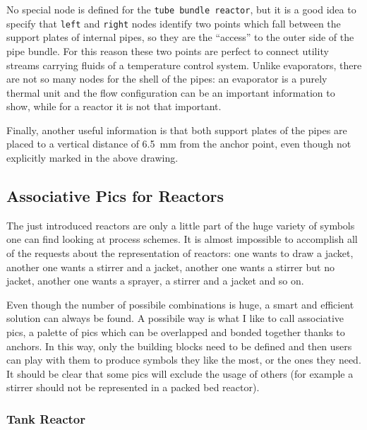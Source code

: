 \documentclass[12pt]{article}						%
\newcommand*{\chpn}[1]{\texttt{#1}}				%
\newcommand*{\chpp}[1]{\texttt{#1}}				%
\begin{document}
No special node is defined for the \chpp{tube bundle reactor}, but it is a good
idea to specify that \chpn{left} and \chpn{right} nodes identify two points which
fall between the support plates of internal pipes, so they are the ``access'' to
the outer side of the pipe bundle. For this reason these two points are perfect
to connect utility streams carrying fluids of a temperature control system.
Unlike evaporators, there are not so many nodes for the shell of the pipes: an
evaporator is a purely thermal unit and the flow configuration can be an
important information to show, while for a reactor it is not that important.

Finally, another useful information is that both support plates of the pipes are
placed to a vertical distance of \SI{6.5}{\mm} from the anchor point, even though
not explicitly marked in the above drawing.

\subsection{Associative Pics for Reactors}

The just introduced reactors are only a little part of the huge variety of
symbols one can find looking at process schemes. It is almost impossible to
accomplish all of the requests about the representation of reactors: one wants
to draw a jacket, another one wants a stirrer and a jacket, another one wants a
stirrer but no jacket, another one wants a sprayer, a stirrer and a jacket and
so on.

Even though the number of possibile combinations is huge, a smart and efficient
solution can always be found. A possibile way is what I like to call associative
pics, a palette of pics which can be overlapped and bonded together thanks to
anchors. In this way, only the building blocks need to be defined and then users
can play with them to produce symbols they like the most, or the ones they need.
It should be clear that some pics will exclude the usage of others (for example a
stirrer should not be represented in a packed bed reactor).

\subsubsection{Tank Reactor}
\end{document}
